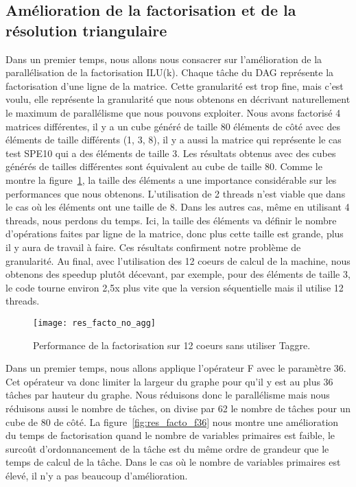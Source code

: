 \subsection{Amélioration de la factorisation et de la résolution triangulaire}
Dans un premier temps, nous allons nous consacrer sur l'amélioration de la parallélisation de la factorisation ILU(k).
%
Chaque tâche du DAG représente la factorisation d'une ligne de la matrice.
%
Cette granularité est trop fine, mais c'est voulu, elle représente la granularité que nous obtenons en décrivant naturellement le maximum  de parallélisme que nous pouvons exploiter.
%
Nous avons factorisé 4 matrices différentes, il y a un cube généré de taille 80 éléments de côté avec des éléments de taille différents (1, 3, 8), il y a aussi la matrice qui représente le cas test SPE10 qui a des éléments de taille 3.
%
Les résultats obtenus avec des cubes générés de tailles différentes sont équivalent au cube de taille 80.
%
Comme le montre la figure~\ref{fig:res_facto_no_agg}, la taille des éléments a une importance considérable sur les performances que nous obtenons.
%
L'utilisation de 2 threads n'est viable que dans le cas où les éléments ont une taille de 8.
%
Dans les autres cas, même en utilisant 4 threads, nous perdons du temps.
%
Ici, la taille des éléments va définir le nombre d'opérations faites par ligne de la matrice, donc plus cette taille est grande, plus il y aura de travail à faire.
%
Ces résultats confirment notre problème de granularité.
%
Au final, avec l'utilisation des 12 coeurs de calcul de la machine, nous obtenons des speedup plutôt décevant, par exemple, pour des éléments de taille 3, le code tourne environ 2,5x plus vite que la version séquentielle mais il utilise 12 threads.


\begin{figure}[t!]
  \centering
  \texttt{[image: res\_facto\_no\_agg]}
  \caption{Performance de la factorisation sur 12 coeurs sans utiliser Taggre.}
  \label{fig:res_facto_no_agg}
\end{figure}

Dans un premier temps, nous allons applique l'opérateur F avec le paramètre 36.
%
Cet opérateur va donc limiter la largeur du graphe pour qu'il y est au plus 36 tâches par hauteur du graphe.
%
Nous réduisons donc le parallélisme mais nous réduisons aussi le nombre de tâches, on divise par 62 le nombre de tâches pour un cube de 80 de côté.
%
La figure~\ref{fig:res_facto_f36} nous montre une amélioration du temps de factorisation quand le nombre de variables primaires est faible, le surcoût d'ordonnancement de la tâche est du même ordre de grandeur que le temps de calcul de la tâche.
%
Dans le cas où le nombre de variables primaires est élevé, il n'y a pas beaucoup d'amélioration.


